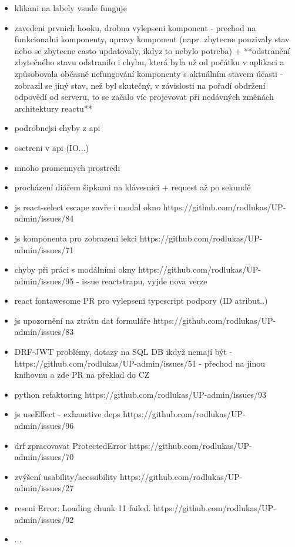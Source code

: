 \begin{itemize}
\item klikani na labely vsude funguje
\item zavedeni prvnich hooku, drobna vylepseni komponent - prechod na funkcionalni komponenty, upravy komponent (napr. zbytecne pouzivaly stav nebo se zbytecne casto updatovaly, ikdyz to nebylo potreba) + **odstranění zbytečného stavu odstranilo i chybu, která byla už od počátku v aplikaci a způsobovala občasné nefungování komponenty s aktuálním stavem účasti - zobrazil se jiný stav, než byl skutečný, v závislosti na pořadí obdržení odpovědí od serveru, to se začalo víc projevovat při nedávných změnách architektury reactu**
\item podrobnejsi chyby z api
\item osetreni v api (IO...)
\item mnoho promennych prostredi
\item  procházení diářem šipkami na klávesnici + request až po sekundě
\item js react-select escape zavře i modal okno https://github.com/rodlukas/UP-admin/issues/84
\item js komponenta pro zobrazeni lekci https://github.com/rodlukas/UP-admin/issues/71
\item chyby při práci s modálními okny https://github.com/rodlukas/UP-admin/issues/95 - issue reactstrapu, vyjde nova verze
\item react fontawesome PR pro vylepseni typescript podpory (ID atribut..)
\item js upozornění na ztrátu dat formuláře https://github.com/rodlukas/UP-admin/issues/83
\item DRF-JWT problémy, dotazy na SQL DB ikdyž nemají být - https://github.com/rodlukas/UP-admin/issues/51 - přechod na jinou knihovnu a zde PR na překlad do CZ
\item python refaktoring https://github.com/rodlukas/UP-admin/issues/93
\item js useEffect - exhaustive deps https://github.com/rodlukas/UP-admin/issues/96
\item drf zpracovavat ProtectedError https://github.com/rodlukas/UP-admin/issues/70
\item zvýšení usability/acessibility https://github.com/rodlukas/UP-admin/issues/27
\item reseni Error: Loading chunk 11 failed. https://github.com/rodlukas/UP-admin/issues/92
\item ...
\end{itemize}

